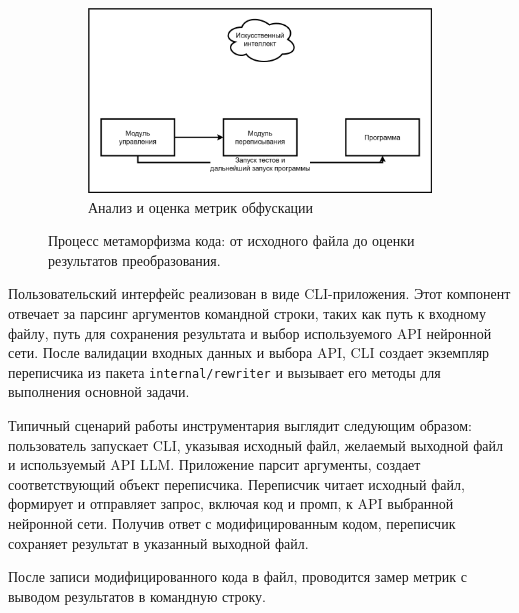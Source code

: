 \begin{figure}[ht!]
    \begin{subfigure}[b]{0.5\textwidth} %
        \centering
        \includegraphics[width=\textwidth]{images/METAMORPHLLM5.png} %
        \caption{Анализ и оценка метрик обфускации}
        \label{fig:photo_221_5}
    \end{subfigure}

    \caption{Процесс метаморфизма кода: от исходного файла до оценки результатов преобразования.}
    \label{fig:metamorph_workflow} %

\end{figure} %

Пользовательский интерфейс реализован в виде CLI-приложения. Этот компонент отвечает за парсинг аргументов командной строки, таких как путь к входному файлу, путь для сохранения результата и выбор используемого API нейронной сети. После валидации входных данных и выбора API, CLI создает экземпляр переписчика из пакета \texttt{internal/rewriter} и вызывает его методы для выполнения основной задачи.

Типичный сценарий работы инструментария выглядит следующим образом: пользователь запускает CLI, указывая исходный файл, желаемый выходной файл и используемый API LLM. Приложение парсит аргументы, создает соответствующий объект переписчика. Переписчик читает исходный файл, формирует и отправляет запрос, включая код и промп, к API выбранной нейронной сети. Получив ответ с модифицированным кодом, переписчик сохраняет результат в указанный выходной файл.

После записи модифицированного кода в файл, проводится замер метрик с выводом результатов в командную строку.

